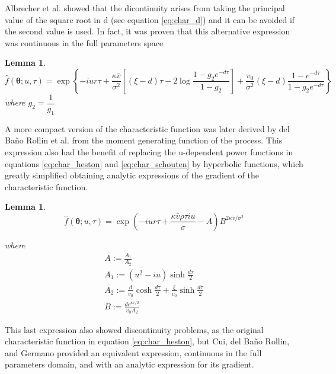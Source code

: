 \documentclass[12,twoside]{mammeTFM}
\newtheorem{lem}[thm]{Lemma}
\theoremstyle{definition}
\theoremstyle{remark}
\begin{document}
Albrecher et al. \cite{Albrecher2007} showed that the dicontinuity arises from taking the principal value of the square root in d (see equation \ref{eq:char_d}) and it can be avoided if the second value is used. In fact, it was proven that this alternative expression was continuous in the full parameters space \cite{sch04}

\begin{lem}
\begin{equation} \label{eq:char_schouten}
\hat{f}(\boldsymbol{\theta} ; u, \tau)=\exp \left\{-i u r \tau
+\frac{\kappa \bar{v}}{\sigma^{2}}\left[(\xi-d) \tau-2 \log \frac{1-g_{2} e^{-d \tau}}{1-g_{2}}\right]+\frac{v_{0}}{\sigma^{2}}(\xi-d) \frac{1-e^{-d \tau}}{1-g_{2} e^{-d \tau}}\right\} 
\end{equation}
where $g_2 = \dfrac{1}{g_1}$
\end{lem}

A more compact version of the characteristic function was later derived by del Ba\~no Rollin et al. \cite{rol10} from the moment generating function of the process. This expression also had the benefit of replacing the u-dependent power functions in equations \ref{eq:char_heston} and \ref{eq:char_schouten} by hyperbolic functions, which greatly simplified obtaining analytic expressions of the gradient of the characteristic function.

\begin{lem}
\begin{equation} \label{eq:char_del_bano}
\hat{f}(\boldsymbol{\theta} ; u, \tau)=\exp \left(-i u r \tau + \frac{\kappa \bar{v} \rho \tau i u}{\sigma}-A\right) B^{2 \kappa \bar{v} / \sigma^{2}}
\end{equation}

where
\begin{equation}\begin{array}{l}
A:=\frac{A_{1}}{A_{2}} \\
A_{1}:=\left(u^{2} - i u\right) \sinh \frac{d \tau}{2} \\
A_{2}:=\frac{d}{v_{0}} \cosh \frac{d \tau}{2}+\frac{\xi}{v_{0}} \sinh \frac{d \tau}{2} \\
B:=\frac{d e^{\kappa \tau / 2}}{v_{0} A_{2}}
\end{array}\end{equation}
\end{lem}

This last expression also showed discontinuity problems, as the original characteristic function in equation \ref{eq:char_heston}, but Cui, del Ba\~no Rollin, and Germano provided an equivalent expression, continuous in the full parameters domain, and with an analytic expression for its gradient.
\end{document}
